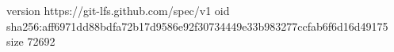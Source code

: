 version https://git-lfs.github.com/spec/v1
oid sha256:aff6971dd88bdfa72b17d9586e92f30734449e33b983277ccfab6f6d16d49175
size 72692
